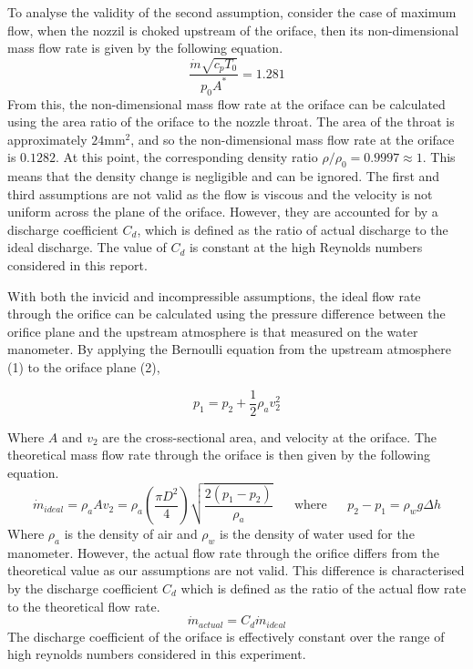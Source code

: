 \documentclass[8pt]{article}
\begin{document}
To analyse the validity of the second assumption, consider the case of maximum flow, when the nozzil is choked upstream of the oriface, then its non-dimensional mass flow rate is given by the following equation.
\begin{equation}
    \frac{\dot{m}\sqrt{c_pT_0}}{p_0A^*} = 1.281
\end{equation}
From this, the non-dimensional mass flow rate at the oriface can be calculated using the area ratio of the oriface to the nozzle throat.
The area of the throat is approximately $24\text{mm}^2$, and so the non-dimensional mass flow rate at the oriface is $0.1282$.
At this point, the corresponding density ratio $\rho/\rho_0 = 0.9997 \approx 1$. This means that the density change is negligible and can be ignored.
The first and third assumptions are not valid as the flow is viscous and the velocity is not uniform across the plane of the oriface. However, they are accounted for by a discharge coefficient $C_d$, which is defined as the ratio of actual discharge to the ideal discharge.
The value of $C_d$ is constant at the high Reynolds numbers considered in this report.

With both the invicid and incompressible assumptions, the ideal flow rate through the orifice can be calculated using the pressure difference between the orifice plane and the upstream atmosphere is that measured on the
water manometer. By applying the Bernoulli equation from the upstream atmosphere (1) to the oriface plane (2),

\begin{equation}
    p_1 = p_2 + \frac{1}{2} \rho_a v_2^2
\end{equation}

Where $A$ and $v_2$ are the cross-sectional area, and velocity at the oriface. The theoretical mass flow rate through the oriface is then given by the following equation.
\begin{equation}
    \dot{m}_{ideal} = \rho_a A v_2 = \rho_a \left( \frac{\pi D^2}{4}\right) \sqrt{\frac{2(p_1-p_2)}{\rho_a}} \;\;\;\;\;\; \text{where} \;\;\;\;\;\ p_2 - p_1 = \rho_w g \Delta h
\end{equation}
Where $\rho_a$ is the density of air and $\rho_w$ is the density of water used for the manometer.
However, the actual flow rate through the orifice differs from the theoretical value as our assumptions are not valid.
This difference is characterised by the discharge coefficient $C_d$ which is defined as the ratio of the actual flow rate to the theoretical flow rate.
\begin{equation}
    \dot{m}_{actual} = C_d \dot{m}_{ideal}
\end{equation}
The discharge coefficient of the oriface is effectively constant over the range of high reynolds numbers considered in this experiment. 
\end{document}
